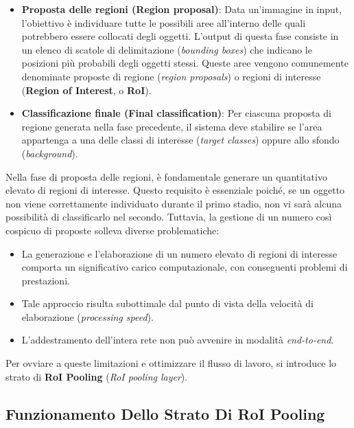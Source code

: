 ﻿\documentclass[11pt, a4paper]{article}
\begin{document}
\begin{itemize}
    \item \textbf{Proposta delle regioni (Region proposal)}: Data un'immagine in input, l'obiettivo è individuare tutte le possibili aree all'interno delle quali potrebbero essere collocati degli oggetti. L'output di questa fase consiste in un elenco di scatole di delimitazione (\emph{bounding boxes}) che indicano le posizioni più probabili degli oggetti stessi. Queste aree vengono comunemente denominate proposte di regione (\emph{region proposals}) o regioni di interesse (\textbf{Region of Interest}, o \textbf{RoI}).

    \item \textbf{Classificazione finale (Final classification)}: Per ciascuna proposta di regione generata nella fase precedente, il sistema deve stabilire se l'area appartenga a una delle classi di interesse (\emph{target classes}) oppure allo sfondo (\emph{background}).
\end{itemize}


Nella fase di proposta delle regioni, è fondamentale generare un quantitativo elevato di regioni di interesse. Questo requisito è essenziale poiché, se un oggetto non viene correttamente individuato durante il primo stadio, non vi sarà alcuna possibilità di classificarlo nel secondo. Tuttavia, la gestione di un numero così cospicuo di proposte solleva diverse problematiche:

\begin{itemize}
    \item La generazione e l'elaborazione di un numero elevato di regioni di interesse comporta un significativo carico computazionale, con conseguenti problemi di prestazioni.
    \item Tale approccio risulta subottimale dal punto di vista della velocità di elaborazione (\emph{processing speed}).
    \item L'addestramento dell'intera rete non può avvenire in modalità \emph{end-to-end}.
\end{itemize}

Per ovviare a queste limitazioni e ottimizzare il flusso di lavoro, si introduce lo strato di \textbf{RoI Pooling} (\emph{RoI pooling layer}).

\newpage

\subsection{Funzionamento Dello Strato Di RoI Pooling}
\end{document}

